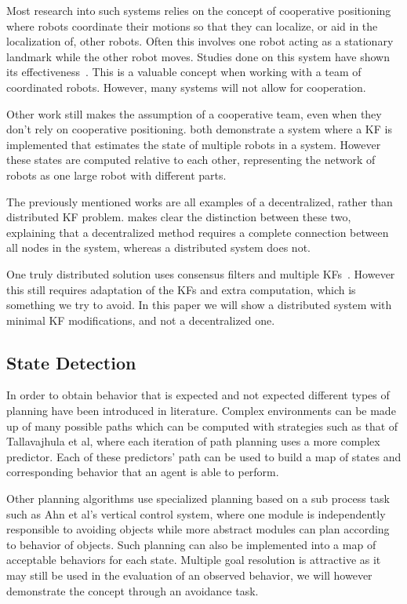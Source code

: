\documentclass[conference]{IEEEtran}
\begin{document}
Most research into such systems relies on the concept of cooperative positioning~\cite{Kurazume1994} where robots coordinate their motions so that they can localize, or aid in the localization of, other robots. Often this involves one robot acting as a stationary landmark while the other robot moves. Studies done on this system have shown its effectiveness~\cite{Kurazume1996, Kurazume1998, Kurazume2000}. This is a valuable concept when working with a team of coordinated robots. However, many systems will not allow for cooperation.

Other work still makes the assumption of a cooperative team, even when they don't rely on cooperative positioning. \textcite{Sanderson1997, Roumeliotis2002} both demonstrate a system where a KF is implemented that estimates the state of multiple robots in a system. However these states are computed relative to each other, representing the network of robots as one large robot with different parts.

The previously mentioned works are all examples of a decentralized, rather than distributed KF problem. \textcite{Olfati-Saber2005} makes clear the distinction between these two, explaining that a decentralized method requires a complete connection between all nodes in the system, whereas a distributed system does not.

One truly distributed solution uses consensus filters and multiple KFs~\cite{Olfati-Saber2005}. However this still requires adaptation of the KFs and extra computation, which is something we try to avoid. In this paper we will show a distributed system with minimal KF modifications, and not a decentralized one. 

\subsection{State Detection}

In order to obtain behavior that is expected and not expected different types of planning have been introduced in literature. Complex environments can be made up of many possible paths which can be computed with strategies such as that of Tallavajhula et al, where each iteration of path planning uses a more complex predictor\cite{tallavajhula2016list}. Each of these predictors' path can be used to build a map of states and corresponding behavior that an agent is able to perform. 

Other planning algorithms use specialized planning based on a sub process task such as Ahn et al's vertical control system, where one module is independently responsible to avoiding objects while more abstract modules can plan according to behavior of objects\cite{ahn2008robust}. Such planning can also be implemented into a map of acceptable behaviors for each state. Multiple goal resolution is attractive as it may still be used in the evaluation of an observed behavior, we will however demonstrate the concept through an avoidance task.
\end{document}
